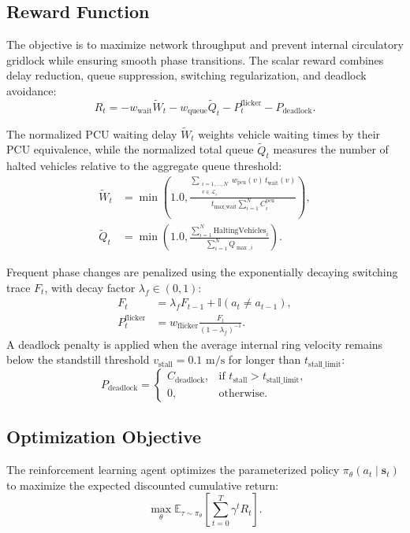 \subsection{Reward Function}
The objective is to maximize network throughput and prevent internal circulatory gridlock while ensuring smooth phase transitions. The scalar reward combines delay reduction, queue suppression, switching regularization, and deadlock avoidance:
\begin{equation*}
R_t=-w_{\text{wait}}\widetilde{W}_t-w_{\text{queue}}\widetilde{Q}_t-P^{\text{flicker}}_t-P_{\text{deadlock}}.
\end{equation*}

The normalized PCU waiting delay $\widetilde{W}_t$ weights vehicle waiting times by their PCU equivalence, while the normalized total queue $\widetilde{Q}_t$ measures the number of halted vehicles relative to the aggregate queue threshold:
\begin{align*}
\widetilde{W}_t &= \min\left(1.0,\frac{\sum_{\substack{i=1,\ldots,N\\v \in \mathcal{L}_i}} w_{\text{pcu}}(v)\,t_{\text{wait}}(v)}{t_{\text{max\_wait}}\sum_{i=1}^N C_i^{\text{pcu}}}\right),\\
\widetilde{Q}_t &= \min\left(1.0, \frac{\sum_{i=1}^N \text{HaltingVehicles}_i}{\sum_{i=1}^N Q_{\max,i}}\right).
\end{align*}

Frequent phase changes are penalized using the exponentially decaying switching trace $F_t$, with decay factor $\lambda_f \in (0,1)$:
\begin{align*}
F_t &= \lambda_f F_{t-1}+\mathbb{I}(a_t \neq a_{t-1}),\\
P^{\text{flicker}}_t &= w_{\text{flicker}}\frac{F_t}{(1-\lambda_f)^{-1}}.
\end{align*}
A deadlock penalty is applied when the average internal ring velocity remains below the standstill threshold $v_{\text{stall}}=0.1\text{ m/s}$ for longer than $t_{\text{stall\_limit}}$:
\begin{equation*}
P_{\text{deadlock}}=
\begin{cases}
C_{\text{deadlock}}, & \text{if } t_{\text{stall}}>t_{\text{stall\_limit}},\\
0, & \text{otherwise}.
\end{cases}
\end{equation*}

\subsection{Optimization Objective}
The reinforcement learning agent optimizes the parameterized policy $\pi_\theta(a_t\mid\mathbf{s}_t)$ to maximize the expected discounted cumulative return:
\begin{equation*}
\max_{\theta}\mathbb{E}_{\tau\sim\pi_\theta}\left[\sum_{t=0}^{T}\gamma^t R_t\right].
\end{equation*}